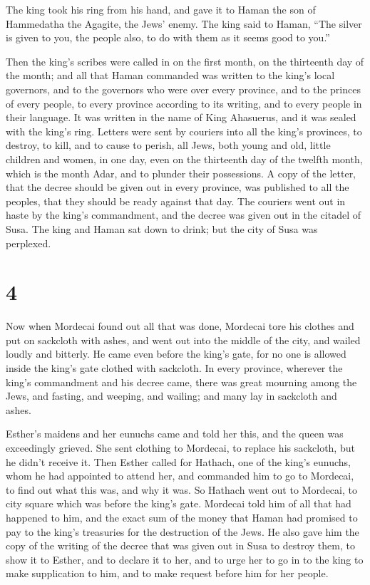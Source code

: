  The king took his ring from his hand, and gave it to Haman
the son of Hammedatha the Agagite, the Jews' enemy.  The
king said to Haman, ``The silver is given to you, the people also, to do
with them as it seems good to you.''

 Then the king's scribes were called in on the first month,
on the thirteenth day of the month; and all that Haman commanded was
written to the king's local governors, and to the governors who were
over every province, and to the princes of every people, to every
province according to its writing, and to every people in their
language. It was written in the name of King Ahasuerus, and it was
sealed with the king's ring.  Letters were sent by couriers
into all the king's provinces, to destroy, to kill, and to cause to
perish, all Jews, both young and old, little children and women, in one
day, even on the thirteenth day of the twelfth month, which is the month
Adar, and to plunder their possessions.  A copy of the
letter, that the decree should be given out in every province, was
published to all the peoples, that they should be ready against that
day.  The couriers went out in haste by the king's
commandment, and the decree was given out in the citadel of Susa. The
king and Haman sat down to drink; but the city of Susa was perplexed.

\hypertarget{section-3}{%
\section{4}\label{section-3}}

 Now when Mordecai found out all that was done, Mordecai
tore his clothes and put on sackcloth with ashes, and went out into the
middle of the city, and wailed loudly and bitterly.  He came
even before the king's gate, for no one is allowed inside the king's
gate clothed with sackcloth.  In every province, wherever
the king's commandment and his decree came, there was great mourning
among the Jews, and fasting, and weeping, and wailing; and many lay in
sackcloth and ashes.

 Esther's maidens and her eunuchs came and told her this,
and the queen was exceedingly grieved. She sent clothing to Mordecai, to
replace his sackcloth, but he didn't receive it.  Then
Esther called for Hathach, one of the king's eunuchs, whom he had
appointed to attend her, and commanded him to go to Mordecai, to find
out what this was, and why it was.  So Hathach went out to
Mordecai, to city square which was before the king's gate. 
Mordecai told him of all that had happened to him, and the exact sum of
the money that Haman had promised to pay to the king's treasuries for
the destruction of the Jews.  He also gave him the copy of
the writing of the decree that was given out in Susa to destroy them, to
show it to Esther, and to declare it to her, and to urge her to go in to
the king to make supplication to him, and to make request before him for
her people.

